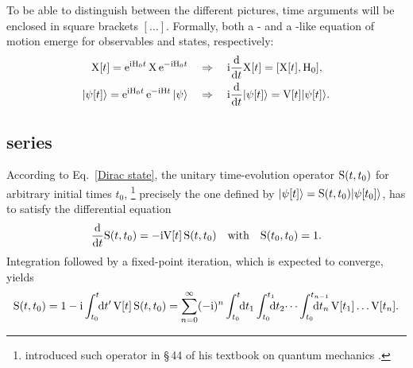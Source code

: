 To be able to distinguish between the different pictures, time arguments will be
enclosed in square brackets $[\dots]$. Formally, both a - and a
-like equation of motion emerge for observables and states,
respectively:
%
\begin{subequations}
    \begin{align}
        \label{Dirac operator}
        \mathrm X[t] = \mathrm e^{\mathrm i \mathrm H_0 t} \, \mathrm X \, \mathrm e^{-\mathrm i \mathrm H_0 t}
        \quad &\Rightarrow \quad
        \mathrm i \frac {\mathrm d} {\mathrm d t} \mathrm X[t] = [\mathrm X[t], \mathrm H_0],
        \\
        \label{Dirac state}
        |\psi[t]\rangle = \mathrm e^{\mathrm i \mathrm H_0 t} \, \mathrm e^{-\mathrm i \mathrm H t} \, |\psi\rangle
        \quad &\Rightarrow \quad
        \mathrm i \frac {\mathrm d} {\mathrm d t} |\psi[t]\rangle = \mathrm V[t] |\psi[t]\rangle.
    \end{align}
\end{subequations}

\subsection{ series}

According to Eq.~\ref{Dirac state}, the unitary time-evolution operator $\mathrm
S(t, t_0)$ for arbitrary initial times $t_0$,%
%
\footnote{ introduced such operator in §\,44  of his textbook on quantum mechanics
\cite{Dirac58}.}
%
precisely the one defined by $|\psi[t]\rangle = \mathrm S(t, t_0) |\psi[t_0]\rangle$,
has to satisfy the differential equation
%
\begin{equation*}
    \frac {\mathrm d} {\mathrm d t} \mathrm S(t, t_0) = -\mathrm i \mathrm V[t] \, \mathrm S(t, t_0)
    \quad \text{with} \quad
    \mathrm S(t_0, t_0) = 1.
\end{equation*}
%
Integration followed by a fixed-point iteration, which is expected to converge,
yields
%
\begin{equation*}
    \op S(t, t_0) = 1 - \I \int \from{t_0} \till t \D t' \,
    \op V[t] \, \op S(t, t_0) =
    \sum_{n = 0}^\infty (-\I)^n
    \int \from{t_0} \till t \D t_1
    \int \from{t_0} \till{t_1} \D t_2 \dots
    \int \from{t_0} \till{t_{n - 1}} \D t_n \,
    \op V[t_1] \dots \op V[t_n].
\end{equation*}

